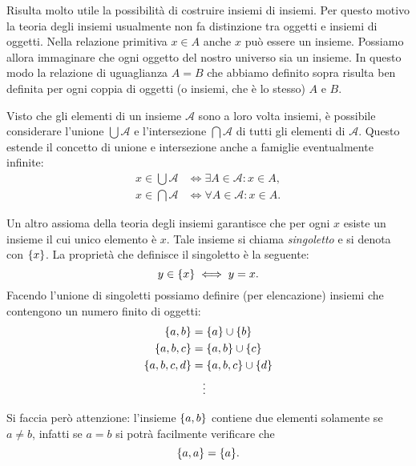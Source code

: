 Risulta molto utile la possibilità di costruire insiemi di insiemi.
Per questo motivo la teoria degli insiemi usualmente non fa distinzione
tra oggetti e insiemi di oggetti. Nella relazione primitiva $x\in A$ anche
$x$ può essere un insieme. Possiamo allora immaginare che ogni oggetto del
nostro universo sia un insieme. In questo modo la relazione di uguaglianza $A=B$
che abbiamo definito sopra risulta ben definita per ogni coppia di oggetti
(o insiemi, che è lo stesso) $A$ e $B$.

Visto che gli elementi di un insieme $\mathcal A$ sono a loro volta insiemi,
è possibile considerare l'unione $\bigcup \mathcal A$
e l'intersezione $\bigcap \mathcal A$ di tutti gli elementi
di $\mathcal A$.
Questo estende il concetto di unione e intersezione anche a famiglie
eventualmente infinite:
\begin{align*}
  x \in \bigcup \mathcal A & \iff \exists A \in \mathcal A \colon x\in A, \\
  x \in \bigcap \mathcal A & \iff \forall A \in \mathcal A \colon x\in A.
\end{align*}

Un altro assioma della teoria degli insiemi garantisce che per ogni
$x$ esiste un insieme il cui unico elemento è $x$. Tale insieme
si chiama \emph{singoletto} e si denota con ${\left\{ x \right\}}$. La proprietà
che definisce il singoletto è la seguente:
\[
  y \in {\left\{ x \right\}} \iff y=x.
\]
Facendo l'unione di singoletti possiamo definire (per elencazione) insiemi che contengono
un numero finito di oggetti:
\begin{align*}
  {\left\{ a,b \right\}} &= {\left\{ a \right\}} \cup {\left\{ b \right\}} \\
  {\left\{ a, b, c \right\}} &= {\left\{ a,b \right\}} \cup {\left\{ c \right\}}\\
  {\left\{ a, b, c, d \right\}} &= {\left\{ a,b,c \right\}} \cup {\left\{ d \right\}}\\
  &\quad\vdots
\end{align*}

Si faccia però attenzione: l'insieme ${\left\{ a,b \right\}}$ contiene due elementi
solamente se $a\neq b$, infatti se $a=b$ si potrà facilmente verificare
che
\begin{equation}\label{eq:4775523}
{\left\{ a,a \right\}} = {\left\{ a \right\}}.
\end{equation}

